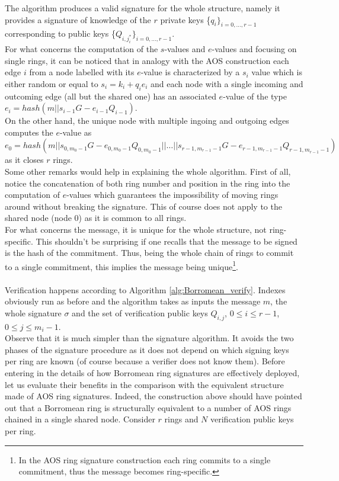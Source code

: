 \noindent
The algorithm produces a valid signature for the whole structure, namely it provides a signature of knowledge of the $r$ private keys \{$q_{i}\}_{i=0,\dots,r-1}$ corresponding to public keys \{$Q_{i,j_i^{*}}\}_{i=0,\dots,r-1}$.\\
For what concerns the computation of the $s$-values and $e$-values and focusing on single rings, it can be noticed that in analogy with the AOS construction each edge $i$ from a node labelled with its $e$-value is characterized by a $s_i$ value which is either random or equal to $s_i = k_i + q_ie_i$ and each node with a single incoming and outcoming edge (all but the shared one) has an associated $e$-value of the type $e_i = hash(m||s_{i-1}G - e_{i-1}Q_{i-1})$.\\
On the other hand, the unique node with multiple ingoing and outgoing edges computes the $e$-value as $e_0 = hash(m||s_{0,m_0-1}G - e_{0,m_0-1}Q_{0,m_0-1}||\dots||s_{{r-1},{m_{r-1}-1}}G - e_{{r-1},{m_{r-1}-1}}Q_{{r-1},{m_{r-1}-1}})$ as it closes $r$ rings.\\
Some other remarks would help in explaining the whole algorithm. First of all, notice the concatenation of both ring number and position in the ring into the computation of $e$-values which guarantees the impossibility of moving rings around without breaking the signature. This of course does not apply to the shared node (node 0) as it is common to all rings.\\
For what concerns the message, it is unique for the whole structure, not ring-specific. This shouldn't be surprising if one recalls that the message to be signed is the hash of the commitment. Thus, being the whole chain of rings to commit to a single commitment, this implies the message being unique\footnote{In the AOS ring signature construction each ring commits to a single commitment, thus the message becomes ring-specific.}.
\\ \ \\
Verification happens according to Algorithm \ref{alg:Borromean_verify}. Indexes obviously run as before and the algorithm takes as inputs the message $m$, the whole signature $\sigma$ and the set of verification public keys $Q_{i,j}$, $0 \leq i \leq r-1$, $0 \leq j \leq m_i-1$.\\
Observe that it is much simpler than the signature algorithm. It avoids the two phases of the signature procedure as it does not depend on which signing keys per ring are known (of course because a verifier does not know them).
Before entering in the details of how Borromean ring signatures are effectively deployed, let us evaluate their benefits in the comparison with the equivalent structure made of AOS ring signatures. Indeed, the construction above should have pointed out that a Borromean ring is structurally equivalent to a number of AOS rings chained in a single shared node. Consider $r$ rings and $N$ verification public keys per ring.
